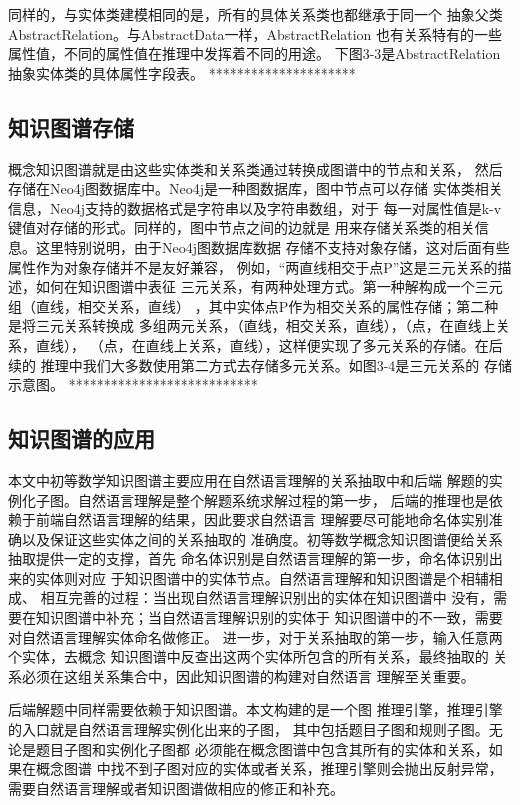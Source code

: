 \documentclass{standalone}
\begin{document}
同样的，与实体类建模相同的是，所有的具体关系类也都继承于同一个
抽象父类AbstractRelation。与AbstractData一样，AbstractRelation
也有关系特有的一些属性值，不同的属性值在推理中发挥着不同的用途。
下图3-3是AbstractRelation抽象实体类的具体属性字段表。
*********************
\subsection{知识图谱存储}
概念知识图谱就是由这些实体类和关系类通过转换成图谱中的节点和关系，
然后存储在Neo4j图数据库中。Neo4j是一种图数据库，图中节点可以存储
实体类相关信息，Neo4j支持的数据格式是字符串以及字符串数组，对于
每一对属性值是k-v键值对存储的形式。同样的，图中节点之间的边就是
用来存储关系类的相关信息。这里特别说明，由于Neo4j图数据库数据
存储不支持对象存储，这对后面有些属性作为对象存储并不是友好兼容，
例如，“两直线相交于点P”这是三元关系的描述，如何在知识图谱中表征
三元关系，有两种处理方式。第一种解构成一个三元组（直线，相交关系，直线）
，其中实体点P作为相交关系的属性存储；第二种是将三元关系转换成
多组两元关系，（直线，相交关系，直线），（点，在直线上关系，直线），
（点，在直线上关系，直线），这样便实现了多元关系的存储。在后续的
推理中我们大多数使用第二方式去存储多元关系。如图3-4是三元关系的
存储示意图。
***************************
\subsection{知识图谱的应用}
本文中初等数学知识图谱主要应用在自然语言理解的关系抽取中和后端
解题的实例化子图。自然语言理解是整个解题系统求解过程的第一步，
后端的推理也是依赖于前端自然语言理解的结果，因此要求自然语言
理解要尽可能地命名体实别准确以及保证这些实体之间的关系抽取的
准确度。初等数学概念知识图谱便给关系抽取提供一定的支撑，首先
命名体识别是自然语言理解的第一步，命名体识别出来的实体则对应
于知识图谱中的实体节点。自然语言理解和知识图谱是个相辅相成、
相互完善的过程：当出现自然语言理解识别出的实体在知识图谱中
没有，需要在知识图谱中补充；当自然语言理解识别的实体于
知识图谱中的不一致，需要对自然语言理解实体命名做修正。
进一步，对于关系抽取的第一步，输入任意两个实体，去概念
知识图谱中反查出这两个实体所包含的所有关系，最终抽取的
关系必须在这组关系集合中，因此知识图谱的构建对自然语言
理解至关重要。

后端解题中同样需要依赖于知识图谱。本文构建的是一个图
推理引擎，推理引擎的入口就是自然语言理解实例化出来的子图，
其中包括题目子图和规则子图。无论是题目子图和实例化子图都
必须能在概念图谱中包含其所有的实体和关系，如果在概念图谱
中找不到子图对应的实体或者关系，推理引擎则会抛出反射异常，
需要自然语言理解或者知识图谱做相应的修正和补充。
\end{document}
